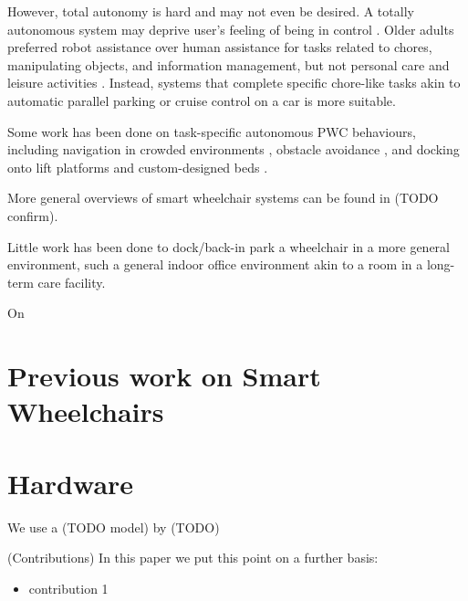 However, total autonomy is hard and may not even be desired. 
A totally autonomous system may deprive user's feeling of being in control 
\cite{viswanathana2014wizard}.
Older adults preferred robot assistance over human assistance for tasks related
to chores, manipulating objects, and information management, but not personal
care and leisure activities \cite{smarr2014domestic}.
Instead, systems that complete specific chore-like tasks akin to automatic
parallel parking or cruise control on a car is more suitable.

Some work has been done on task-specific autonomous PWC behaviours, including
navigation in crowded environments \cite{prassler2001robotics}, obstacle
avoidance \cite{viswanathan2012navigation}, and docking onto lift platforms
\cite{sermeno2006vision} and custom-designed beds \cite{ren2012docking}.

More general overviews of smart wheelchair systems can be found in
\cite{viswanathan2012navigation, simpson2005smart, faria2013patient} (TODO
confirm).

Little work has been done to dock/back-in park a wheelchair in a more general
environment, such a general indoor office environment akin to a room in a
long-term care facility. 


On


\section{Previous work on Smart Wheelchairs}

\section{Hardware}
We use a (TODO model) by (TODO) 

(Contributions) In this paper we put this point on a further basis:
\begin{itemize}
\item contribution 1
\end{itemize}

\endinput
Any text after an \endinput is ignored.

\section{Summary of Thesis}

